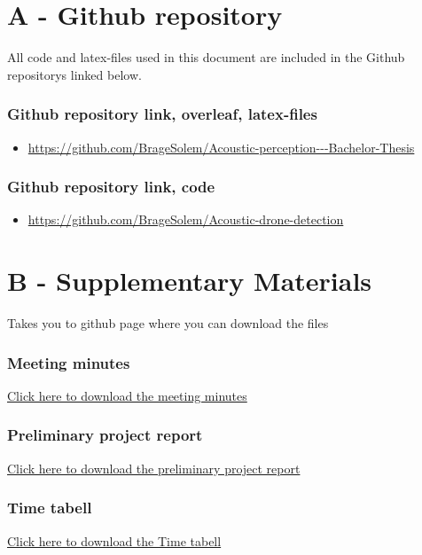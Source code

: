 

\chapter*{A - Github repository}

All code and latex-files used in this document are included in the Github repositorys linked below. 


\subsection*{Github repository link, overleaf, latex-files }
\begin{itemize}
    \item \url{https://github.com/BrageSolem/Acoustic-perception---Bachelor-Thesis}
\end{itemize}

\subsection*{Github repository link, code}
\begin{itemize}
    \item \url{https://github.com/BrageSolem/Acoustic-drone-detection}
\end{itemize}


\chapter{B - Supplementary Materials}
Takes you to github page where you can download the files

\subsection{Meeting minutes}
\href{https://github.com/BrageSolem/Acoustic-perception---Bachelor-Thesis/blob/main/Appendix%20files/M%C3%B8tereferat.zip}{Click here to download the meeting minutes}

\subsection{Preliminary project report}
\href{https://github.com/BrageSolem/Acoustic-perception---Bachelor-Thesis/blob/main/Appendix%20files/Forprosjektrapport_bachler.pdf}{Click here to download the preliminary project report}

\subsection{Time tabell}
\href{https://github.com/BrageSolem/Acoustic-perception---Bachelor-Thesis/blob/main/Appendix%20files/timeliste%20bachelor%20oppgave.xlsx}{Click here to download the Time tabell}

